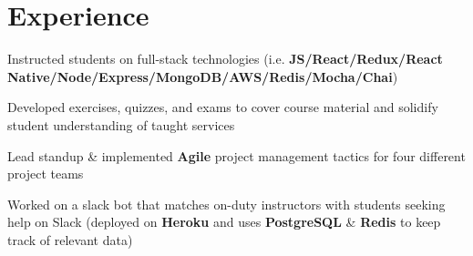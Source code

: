 \documentclass[letterpaper]{deedy-resume} %
\begin{document}
\begin{minipage}[t]{0.66\textwidth} %


  

  \section{Experience}



  \vspace{3mm}
  \begin{tightitemize}
  \item Instructed students on full-stack technologies (i.e. \textbf{JS/React/Redux/React Native/Node/Express/MongoDB/AWS/Redis/Mocha/Chai})
  \item Developed exercises, quizzes, and exams to cover course material and solidify student understanding of taught services
  \item Lead standup \& implemented \textbf{Agile} project management tactics for four different project teams
  \item Worked on a slack bot that matches on-duty instructors with students seeking help on Slack (deployed on \textbf{Heroku} and uses \textbf{PostgreSQL} \& \textbf{Redis} to keep track of relevant data)
  \end{tightitemize}

  \sectionspace %



\end{minipage}
\end{document}
